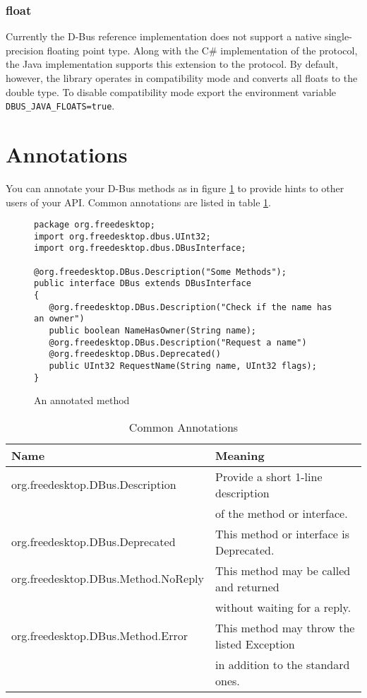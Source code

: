 \documentclass[a4paper,12pt]{article}
\begin{document}
\subsubsection{float}

Currently the D-Bus reference implementation does not support a native
single-precision floating point type. Along with the C\# implementation of the
protocol, the Java implementation supports this extension to the protocol. By
default, however, the library operates in compatibility mode and converts all
floats to the double type. To disable compatibility mode export the environment
variable {\tt DBUS\_JAVA\_FLOATS=true}.

\section{Annotations}

You can annotate your D-Bus methods as in figure \ref{fig:annotation} to provide hints to other users of your API. Common annotations are listed in table \ref{tab:annotations}.

\begin{figure}[htb]
\begin{center}
\begin{verbatim}
package org.freedesktop;
import org.freedesktop.dbus.UInt32;
import org.freedesktop.dbus.DBusInterface;

@org.freedesktop.DBus.Description("Some Methods");
public interface DBus extends DBusInterface
{
   @org.freedesktop.DBus.Description("Check if the name has an owner")
   public boolean NameHasOwner(String name);
   @org.freedesktop.DBus.Description("Request a name")
   @org.freedesktop.DBus.Deprecated()
   public UInt32 RequestName(String name, UInt32 flags);
}
\end{verbatim}
\end{center}
\caption{An annotated method}
\label{fig:annotation}
\end{figure}


\begin{table}[htb]
\begin{tabular}{l|l}
{\bf Name} & {\bf Meaning} \\
\hline
org.freedesktop.DBus.Description & Provide a short 1-line description \\
      & of the method or interface. \\
org.freedesktop.DBus.Deprecated & This method or interface is Deprecated. \\
org.freedesktop.DBus.Method.NoReply & This method may be called and returned \\
   & without waiting for a reply. \\
org.freedesktop.DBus.Method.Error & This method may throw the listed Exception\\
   & in addition to the standard ones. \\
\end{tabular}
\caption{Common Annotations}
\label{tab:annotations}
\end{table}
\end{document}
